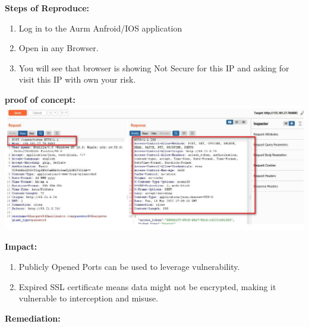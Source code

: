 \documentclass{article}
\begin{document}
\begin{description}[itemsep=2pt, leftmargin=0.2cm]
                    \item \large \textbf{Steps of Reproduce:}
                            \linespread{1.0}
                            \begin{enumerate}[leftmargin=0.5cm]
                             
                             \item \large Log in to the Aurm Anfroid/IOS application

                             \item \large Open in any Browser.

                             \item \large You will see that browser is showing Not Secure for this IP and asking for visit this IP with own your risk.
                             \end{enumerate}

                    \item \large \textbf{proof of concept: \\ \includegraphics[width=1.0\textwidth]{2.png} } 

                    \item \large \textbf{Impact:}
                            \linespread{1.0}
                            \begin{enumerate}[leftmargin=0.5cm]
                             \item \large Publicly Opened Ports can be used to leverage vulnerability.
\item \large Expired SSL certificate means data might not be encrypted, making it vulnerable to interception and misuse. 
                            \end{enumerate}  
                            
                            
                    \item \large \textbf{Remediation:}
                            \linespread{1.0}
                            \begin{enumerate}[leftmargin=0.5cm]
                             

\end{enumerate}
\end{description}
\end{document}

